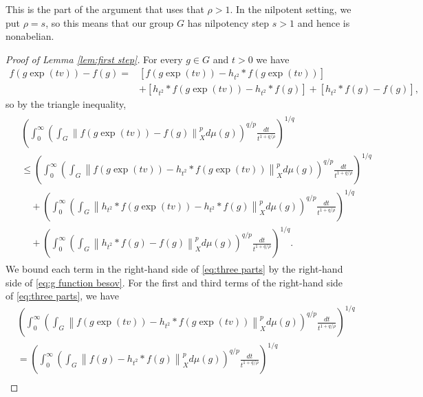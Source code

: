 \documentclass[11pt,reqno]{amsart}
\newcommand{\1}{\mathbf 1}
\begin{document}
This is the part of the argument that uses that $\rho>1$. In the nilpotent setting, we put $\rho=s$, so this means that our group $G$ has nilpotency step $s>1$ and hence is nonabelian.

\begin{proof}[Proof of Lemma \ref{lem:first step}]
For every $g\in G$ and $t>0$ we have
\begin{align*}
f\left(g\exp\left(tv\right)\right)-f\left(g\right)=&\left[f\left(g\exp\left(tv\right)\right)-h_{t^2}*f\left(g\exp\left(tv\right)\right)\right]\\
&+\left[h_{t^2}*f\left(g\exp\left(tv\right)\right)-h_{t^2}*f\left(g\right)\right]+\left[h_{t^2}*f\left(g\right)-f\left(g\right)\right],
\end{align*}
so by the triangle inequality,
\begin{align}\label{eq:three parts}
\begin{aligned}
&\left(\int_0^\infty \left(\int_{G}\left\|f\left(g\exp\left(tv\right)\right)-f\left(g\right)\right\|_X^pd\mu\left(g\right)\right)^{q/p}\frac{dt}{t^{1+q/\rho}}\right)^{1/q}\\
&\le  \left(\int_0^\infty \left(\int_{G}\left\|f\left(g\exp\left(tv\right)\right)-h_{t^2}*f\left(g\exp\left(tv\right)\right)\right\|_X^pd\mu\left(g\right)\right)^{q/p}\frac{dt}{t^{1+q/\rho}}\right)^{1/q}\\
&\quad+\left(\int_0^\infty \left(\int_{G}\left\|h_{t^2}*f\left(g\exp\left(tv\right)\right)-h_{t^2}*f\left(g\right)\right\|_X^pd\mu\left(g\right)\right)^{q/p}\frac{dt}{t^{1+q/\rho}}\right)^{1/q}\\
&\quad +\left(\int_0^\infty \left(\int_{G}\left\|h_{t^2}*f\left(g\right)-f\left(g\right)\right\|_X^pd\mu\left(g\right)\right)^{q/p}\frac{dt}{t^{1+q/\rho}}\right)^{1/q}.
\end{aligned}
\end{align}
We bound each term in the right-hand side of \eqref{eq:three parts} by the right-hand side of \eqref{eq:g function besov}. For the first and third terms of the right-hand side of \eqref{eq:three parts}, we have
\begin{align*}
&\left(\int_0^\infty \left(\int_{G}\left\|f\left(g\exp\left(tv\right)\right)-h_{t^2}*f\left(g\exp\left(tv\right)\right)\right\|_X^pd\mu\left(g\right)\right)^{q/p}\frac{dt}{t^{1+q/\rho}}\right)^{1/q}\\
&=\left(\int_0^\infty \left( \int_{G}\left\|f\left(g\right)-h_{t^2}*f\left(g\right)\right\|_X^pd\mu\left(g\right)\right)^{q/p}\frac{dt}{t^{1+q/\rho}}\right)^{1/q}\\

\end{align*}
\end{proof}
\end{document}
